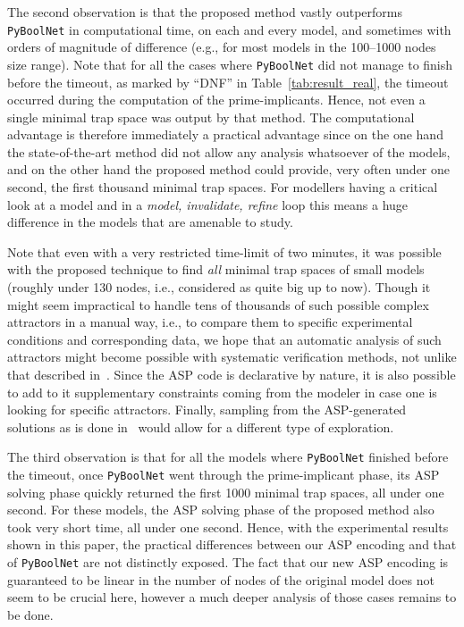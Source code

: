 \documentclass[preprint,12pt]{elsarticle}
\begin{document}
The second observation is that the proposed method vastly outperforms \texttt{PyBoolNet} in computational time, on each and every model, and sometimes with orders of magnitude of difference (e.g., for most models in the 100--1000 nodes size range).
Note that for all the cases where \texttt{PyBoolNet} did not manage to finish before the timeout, as marked by ``DNF'' in Table~\ref{tab:result_real}, the timeout occurred during the computation of the prime-implicants.
Hence, not even a single minimal trap space was output by that method.
The computational advantage is therefore immediately a practical advantage since on the one hand the state-of-the-art method did not allow any analysis whatsoever of the models, and on the other hand the proposed method could provide, very often under one second, the first thousand minimal trap spaces.
For modellers having a critical look at a model and in a \emph{model, invalidate, refine} loop this means a huge difference in the models that are amenable to study.

Note that even with a very restricted time-limit of two minutes, it was possible with the proposed technique to find \emph{all} minimal trap spaces of small models (roughly under 130 nodes, i.e., considered as quite big up to now).
Though it might seem impractical to handle tens of thousands of such possible complex attractors in a manual way, i.e., to compare them to specific experimental conditions and corresponding data, we hope that an automatic analysis of such attractors might become possible with systematic verification methods, not unlike that described in~\cite{hernandez2020computational}.
Since the ASP code is declarative by nature, it is also possible to add to it supplementary constraints coming from the modeler in case one is looking for specific attractors.
Finally, sampling from the ASP-generated solutions as is done in~\cite{chevalier2020synthesis} would allow for a different type of exploration.

The third observation is that for all the models where \texttt{PyBoolNet} finished before the timeout, once \texttt{PyBoolNet} went through the prime-implicant phase, its ASP solving phase quickly returned the first 1000 minimal trap spaces, all under one second.
For these models, the ASP solving phase of the proposed method also took very short time, all under one second.
Hence, with the experimental results shown in this paper, the practical differences between our ASP encoding and that of \texttt{PyBoolNet} are not distinctly exposed.
The fact that our new ASP encoding is guaranteed to be linear in the number of nodes of the original model does not seem to be crucial here, however a much deeper analysis of those cases remains to be done.
\end{document}
